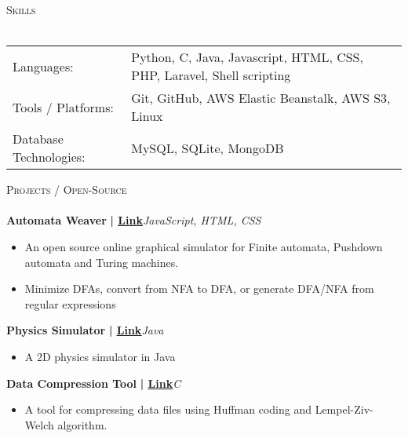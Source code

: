 \documentclass[a4paper]{article}
\newcommand{\lineunder} {
    \vspace*{-8pt} \\
    \hspace*{-18pt} \hrulefill \\
}
\newcommand{\header} [1] {
    {\hspace*{-18pt}\vspace*{6pt} \textsc{#1}}
    \vspace*{-6pt} \lineunder
}
\begin{document}
%
%
  \header{Skills}
  \vspace{2mm}
  \begin{longtable}{p{4cm}p{12cm}}
  Languages: & Python, C, Java, Javascript, HTML, CSS, PHP, Laravel, Shell scripting \\
  Tools / Platforms: & Git, GitHub, AWS Elastic Beanstalk, AWS S3, Linux \\
  Database Technologies: & MySQL, SQLite, MongoDB \\
  \end{longtable}
  \vspace{1mm}

      \header{Projects / Open-Source}
      \vspace{2mm}
      {\textbf{Automata Weaver}}\textbf{ | \href{https://github.com/syedhuzaif199/automata-weaver}{\underline{Link}}}\hfill{\sl JavaScript, HTML, CSS}\\
          \vspace{-1mm}
\begin{itemize} \itemsep -3pt
\item  An open source online graphical simulator for Finite automata, Pushdown automata and Turing machines.
\item  Minimize DFAs, convert from NFA to DFA, or generate DFA/NFA from regular expressions
\end{itemize}
          \vspace*{3mm}
      {\textbf{Physics Simulator}}\textbf{ | \href{https://github.com/syedhuzaif199/physics-simulator}{\underline{Link}}}\hfill{\sl Java}\\
          \vspace{-1mm}
\begin{itemize} \itemsep -3pt
\item[] A 2D physics simulator in Java
\end{itemize}
          \vspace*{3mm}
      {\textbf{Data Compression Tool}}\textbf{ | \href{https://github.com/syedhuzaif199/data-compression-tool}{\underline{Link}}}\hfill{\sl C}\\
          \vspace{-1mm}
\begin{itemize} \itemsep -3pt
\item[] A tool for compressing data files using Huffman coding and Lempel-Ziv-Welch algorithm.
\end{itemize}
\end{document}

